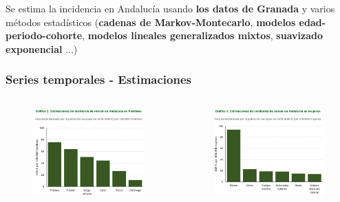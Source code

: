 \documentclass{beamer}
\begin{document}
\begin{frame}
\centering
Se estima la incidencia en Andalucía usando \textbf{los datos de Granada} y varios métodos estadísticos (\textbf{cadenas de Markov-Montecarlo}, \textbf{modelos edad-periodo-cohorte}, \textbf{modelos lineales generalizados mixtos}, \textbf{suavizado exponencial} ...)
	
\end{frame}

\begin{frame}\frametitle{Series temporales - Estimaciones}

	\begin{columns}
		\begin{column}{0.5\textwidth}
			\begin{figure}
				\centering
				\includegraphics[width=\textwidth]{images/estimaciones_hombres.png}
			\end{figure}
		\end{column}
		\begin{column}{0.5\textwidth}
			\begin{figure}
				\centering
				\includegraphics[width=\textwidth]{images/estimaciones_mujeres.png}

\end{figure}
\end{column}
\end{columns}
\end{frame}
\end{document}
